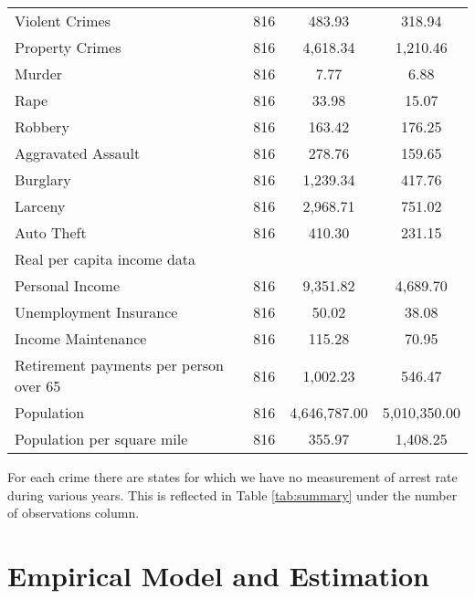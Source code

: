 \documentclass{article}
\begin{document}
\begin{table}[H]
\begin{tabular}[h]{@{\extracolsep{5pt}}lccc}
\hspace{3mm}Violent Crimes & 816 & 483.93 & 318.94 \\ 
\hspace{3mm}Property Crimes & 816 & 4,618.34 & 1,210.46 \\ 
\hspace{3mm}Murder & 816 & 7.77 & 6.88 \\ 
\hspace{3mm}Rape & 816 & 33.98 & 15.07 \\ 
\hspace{3mm}Robbery& 816 & 163.42 & 176.25 \\ 
\hspace{3mm}Aggravated Assault & 816 & 278.76 & 159.65 \\ 
\hspace{3mm}Burglary & 816 & 1,239.34 & 417.76 \\ 
\hspace{3mm}Larceny & 816 & 2,968.71 & 751.02 \\ 
\hspace{3mm}Auto Theft & 816 & 410.30 & 231.15 \\ 
Real per capita income data &&&\\
\hspace{3mm}Personal Income & 816 & 9,351.82 & 4,689.70 \\ 
\hspace{3mm}Unemployment Insurance & 816 & 50.02 & 38.08 \\ 
\hspace{3mm}Income Maintenance & 816 & 115.28 & 70.95 \\ 
\hspace{3mm}Retirement payments per person over 65 & 816 & 1,002.23 & 546.47 \\ 
Population & 816 & 4,646,787.00 & 5,010,350.00 \\ 
Population per square mile & 816 & 355.97 & 1,408.25 \\ 
\bottomrule
\end{tabular} 
\end{table} 

For each crime there are states for which we have no measurement of arrest rate during various years. This is reflected in Table \ref{tab:summary} under the number of observations column.
\section*{Empirical Model and Estimation}
\end{document}
